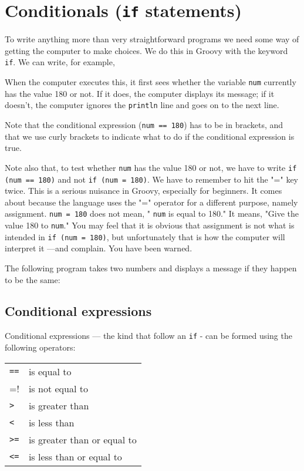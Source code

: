 \section{Conditionals (\texttt{if} statements)}

To write anything more than very straightforward programs we need some way
of getting the computer to make choices.
We do this in Groovy with the keyword \verb!if!.
We can write, for example,


When the computer executes this, it first sees whether the variable \verb!num!
currently has the value 180 or not.  If it does, the computer displays
its message; if it doesn't, the computer ignores the  \verb!println! line
and goes on to the next line.

Note that the conditional expression (\verb!num == 180!) has to be
in brackets, and that we use curly brackets to indicate what to do if
the conditional expression is true. 

Note also that, to test whether  \verb!num! has the value 180
or not, we have to write \verb!if (num == 180)! and not \verb!if (num = 180)!.
We have to remember to hit the "=" key twice.
This is a serious nuisance in Groovy, especially for beginners.
It comes about because the language uses the "=" operator for a different
purpose, namely assignment.  \verb!num = 180! does not mean, " \verb!num! is
equal to 180."  It means, "Give the value 180 to  \verb!num!."  You may feel
that it is obvious that assignment is not what is intended in
\verb!if (num = 180)!, but unfortunately that is
how the computer will interpret it ---and complain.
You have been warned.

The following program takes two numbers and displays a message if they happen
to be the same:


\subsection{Conditional expressions}
\label{sec:cond-expr}

Conditional expressions --- the kind that follow an \verb!if! -
can be formed using the following operators:

\begin{tabular}{ll}
\verb!==! &is equal to\\
\verb!!=! &is not equal to\\
\verb!>! &is greater than\\
\verb!<! &is less than\\
\verb!>=! & is greater than or equal to\\
\verb!<=! &is less than or equal to\\
\end{tabular}

